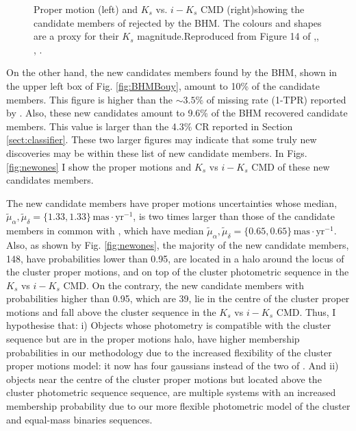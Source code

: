 \begin{figure}[htbp]
\begin{center}
\caption{Proper motion (left) and $K_s$ vs. $i-K_s$ CMD (right)showing the candidate members of \citet{Bouy2015} rejected by the BHM. The colours and shapes are a proxy for their $K_s$ magnitude.Reproduced from Figure 14 of \citet{Olivares2017},\textit{}, , .}
\label{fig:rejectedsCOLORS}
\end{center}
\end{figure}

On the other hand, the new candidates members found by the BHM, shown in the upper left box of Fig. \ref{fig:BHMBouy}, amount to 10\% of the \citet{Bouy2015} candidate members. This figure is higher than the $\sim 3.5\%$ of missing rate (1-TPR) reported by \citet{Sarro2014}. Also, these new candidates amount to 9.6\% of the BHM recovered candidate members. This value is larger than the 4.3\% CR reported in Section \ref{sect:classifier}. These two larger figures may indicate that some truly new discoveries may be within these list of new candidate members. In Figs. \ref{fig:newones} I show the proper motions and $K_s$ vs $i-K_s$ CMD of these new candidates members.

The new candidate members have proper motions uncertainties whose median, $\tilde{\mu}_{\alpha},\tilde{\mu}_{\delta}=\{1.33,1.33\} \,\mathrm{mas\cdot yr^{-1}}$, is two times larger than those of the candidate members in common with \citet{Bouy2015}, which have median $\tilde{\mu}_{\alpha},\tilde{\mu}_{\delta}=\{0.65,0.65\} \,\mathrm{mas\cdot yr^{-1}}$. Also, as shown by Fig. \ref{fig:newones}, the majority of the new candidate members, 148, have probabilities lower than 0.95, are located in a halo around the locus of the cluster proper motions, and on top of the cluster photometric sequence in the $K_s$ vs $i-K_s$ CMD. On the contrary, the new candidate members with probabilities higher than 0.95, which are 39, lie in the centre of the cluster proper motions and fall above the cluster sequence in the $K_s$ vs $i-K_s$ CMD. Thus, I hypothesise that: i) Objects whose photometry is compatible with the cluster sequence but are in the proper motions halo, have higher membership probabilities in our methodology due to the increased flexibility of the cluster proper motions model: it now has four gaussians instead of the two of \citet{Bouy2015}. And ii) objects near the centre of the cluster proper motions but located above the cluster photometric sequence sequence, are multiple systems \cite[probably triple systems which can amount to 4\% of the population][]{Duquennoy1991} with an increased membership probability due to our more flexible photometric model of the cluster and equal-mass binaries sequences.

